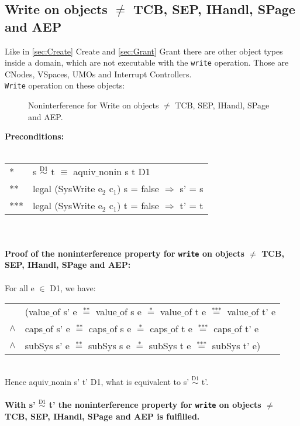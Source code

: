 \subsection{Write on objects $\neq$ TCB, SEP, IHandl, SPage and AEP}\label{WriteOthers}
Like in \ref{sec:Create} Create and \ref{sec:Grant} Grant there are other object types inside a domain, which are not executable with the \texttt{write} operation. Those are CNodes, VSpaces, UMOs and Interrupt Controllers. \\
\texttt{Write} operation on these objects: \\
\begin{figure}[H]
\caption{Noninterference for Write on objects $\neq$ TCB, SEP, IHandl, SPage and AEP.}
\end{figure}
\textbf{Preconditions:} \\ \\
\begin{tabular}{ll}
* & s $\overset{\text{D1}}{\sim}$ t $\equiv$ aquiv$\_$nonin s t D1	\\ 
** & legal (SysWrite e$_2$ c$_1$) s = false $\Rightarrow$ s' = s \\ 
*** & legal (SysWrite e$_2$ c$_1$) t = false $\Rightarrow$ t' = t
\end{tabular} \\ \\ 
\textbf{Proof of the noninterference property for \texttt{write} on objects $\neq$ TCB, SEP, IHandl, SPage and AEP:}\\ \\
For all e $\in$ D1, we have: \\ 
\begin{tabular}{ll}
& (value$\_$of s' e $\overset{\text{**}}{=}$ value$\_$of s e $\overset{\text{*}}{=}$ value$\_$of t e $\overset{\text{***}}{=}$ value$\_$of t' e \\
$\wedge$ & caps$\_$of s' e $\overset{\text{**}}{=}$ caps$\_$of s e $\overset{\text{*}}{=}$ caps$\_$of t e $\overset{\text{***}}{=}$ caps$\_$of t' e \\
$\wedge$ & subSys s' e $\overset{\text{**}}{=}$ subSys s e $\overset{\text{*}}{=}$ subSys t e $\overset{\text{***}}{=}$ subSys t' e)
\end{tabular} \\
Hence aquiv$\_$nonin s' t' D1, what is equivalent to s' $\overset{\text{D1}}{\sim}$ t'.\\ \\ 
\textbf{With s' $\overset{\text{D1}}{\sim}$ t' the noninterference property for \texttt{write} on objects $\neq$ TCB, SEP, IHandl, SPage and AEP is fulfilled.} 
